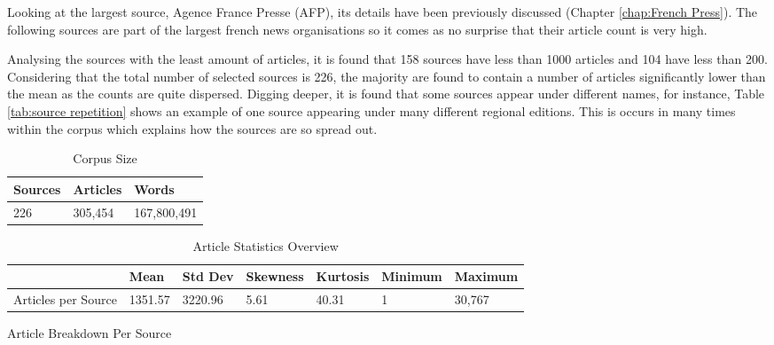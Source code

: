 Looking at the largest source, Agence France Presse (AFP), its details have been previously discussed (Chapter \ref{chap:French Press}). The following sources are part of the largest french news organisations so it comes as no surprise that their article count is very high.

Analysing the sources with the least amount of articles, it is found that 158 sources have less than 1000 articles and 104 have less than 200. Considering that the total number of selected sources is 226, the majority are found to contain a number of articles significantly lower than the mean as the counts are quite dispersed. Digging deeper, it is found that some sources appear under different names, for instance, Table \ref{tab:source repetition} shows an example of one source appearing under many different regional editions. This is occurs in many times within the corpus which explains how the sources are so spread out. 

\begin{table}[]
\centering
\caption{Corpus Size}
\label{tab: corpus size}
\begin{tabular}{lll}
\toprule
Sources & Articles & Words \\ \hline
226 & 305,454 & 167,800,491 \\
\bottomrule
\end{tabular}
\end{table}

\begin{table}[]
\centering
\caption{Article Statistics Overview}
\label{tab:core stat source}
\begin{tabular}{@{}lllllll@{}}
\toprule
 & Mean & Std Dev & Skewness & Kurtosis & Minimum & Maximum \\ \midrule
Articles per Source & 1351.57 & 3220.96 & 5.61 & 40.31 & 1 & 30,767 \\ \bottomrule
\end{tabular}
\end{table}

\begin{table}[]
\caption{Article Breakdown Per Source}
\label{tab:stat source}
\centering
{}
\end{table}

